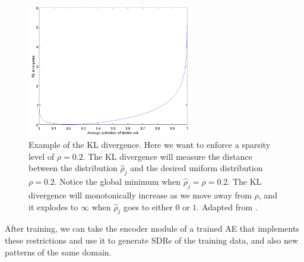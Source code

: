 \documentclass{article}
\begin{document}
\begin{figure}[h]
    \centering
    \includegraphics[width=0.65\textwidth]{img/KL.PNG}
    \caption{Example of the KL divergence. Here we want to enforce a sparsity level of $\rho = 0.2$. The KL divergence will measure the distance between the distribution $\hat\rho_j$ and the desired uniform distribution $\rho = 0.2$. Notice the global minimum when $\hat\rho_j = \rho = 0.2 $. The KL divergence will monotonically increase as we move away from $\rho$, and it explodes to $\infty$ when $\hat\rho_j$ goes to either $0$ or $1$. Adapted from \cite{ng2011sparse}.}
\label{fig:KL}
\end{figure}

After training, we can take the encoder module of a trained AE that implements these restrictions and use it to generate SDRs of the training data, and also new patterns of the same domain.
\end{document}
